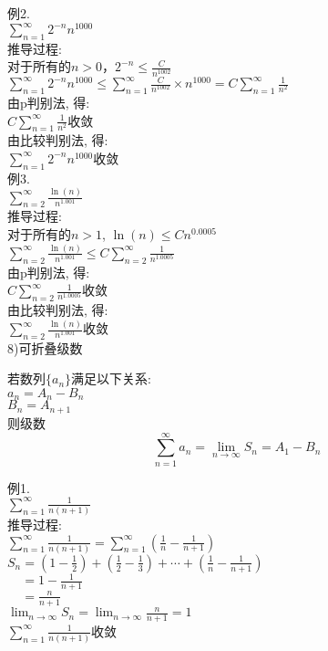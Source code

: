 例2.\\
\phantom{例}$\displaystyle\sum_{n=1}^{\infty}2^{-n}n^{1000}$\\
推导过程:\\
对于所有的$n>0$，$\displaystyle 2^{-n}\leqslant\frac{C}{n^1002}$\\
$\displaystyle\sum_{n=1}^{\infty}2^{-n}n^{1000}\leqslant\sum_{n=1}^{\infty}\frac{C}{n^{1002}}\times n^{1000}=C\sum_{n=1}^{\infty}\frac{1}{n^2}$\\
由p判别法, 得:\\
$\displaystyle C\sum_{n=1}^{\infty}\frac{1}{n^2}$收敛\\
由比较判别法, 得:\\
$\displaystyle\sum_{n=1}^{\infty}2^{-n}n^{1000}$收敛\\[1ex]

例3.\\
\phantom{例}$\displaystyle\sum_{n=2}^\infty\frac{\ln(n)}{n^{1.001}}$\\
推导过程:\\
对于所有的$n>1$, $\ln(n)\leqslant Cn^{0.0005}$\\
$\displaystyle\sum_{n=2}^\infty\frac{\ln(n)}{n^{1.001}}\leqslant C\sum_{n=2}^\infty\frac{1}{n^{1.0005}}$\\
由p判别法, 得:\\
$\displaystyle C\sum_{n=2}^\infty\frac{1}{n^{1.0005}}$收敛\\
由比较判别法, 得:\\
$\displaystyle\sum_{n=2}^\infty\frac{\ln(n)}{n^{1.001}}$收敛\\[2ex]

8)可折叠级数
\begin{center}
\begin{boxedminipage}{\textwidth}
若数列$\{a_n\}$满足以下关系:\\
		$a_n=A_n-B_n$\\
		$B_n=A_{n+1}$\\
则级数
		\[\sum_{n=1}^\infty a_n=\lim_{n\to\infty}S_n=A_1-B_n\]
\end{boxedminipage}
\end{center}

例1.\\
\phantom{例}$\displaystyle\sum_{n=1}^\infty\frac{1}{n(n+1)}$\\
推导过程:\\
$\displaystyle\sum_{n=1}^\infty\frac{1}{n(n+1)}=\sum_{n=1}^\infty(\frac{1}{n}-\frac{1}{n+1})$\\
$\displaystyle S_n=(1-\frac{1}{2})+(\frac{1}{2}-\frac{1}{3})+\cdots+(\frac{1}{n}-\frac{1}{n+1})$\\
$\displaystyle\phantom{S_n}=1-\frac{1}{n+1}$\\
$\displaystyle\phantom{S_n}=\frac{n}{n+1}$\\
$\displaystyle\lim_{n\to\infty}S_n=\lim_{n\to\infty}\frac{n}{n+1}=1$\\
$\displaystyle\sum_{n=1}^\infty\frac{1}{n(n+1)}$收敛\\[1ex]

